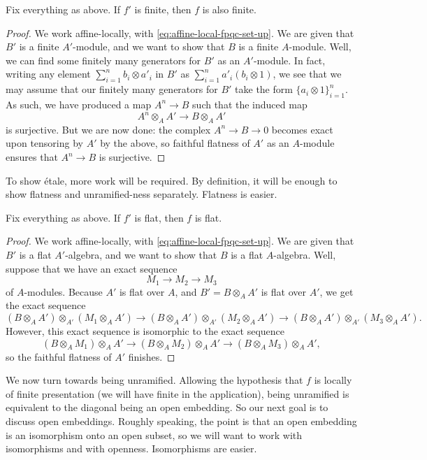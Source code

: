\documentclass{amsart}
\begin{document}
\begin{lemma} \label{lem:finite-descent}
    Fix everything as above. If $f'$ is finite, then $f$ is also finite.
\end{lemma}
\begin{proof}
    We work affine-locally, with \eqref{eq:affine-local-fpqc-set-up}. We are given that $B'$ is a finite $A'$-module, and we want to show that $B$ is a finite $A$-module. Well, we can find some finitely many generators for $B'$ as an $A'$-module. In fact, writing any element $\sum_{i=1}^nb_i\otimes a'_i$ in $B'$ as $\sum_{i=1}^na'_i(b_i\otimes1)$, we see that we may assume that our finitely many generators for $B'$ take the form $\{a_i\otimes1\}_{i=1}^n$. As such, we have produced a map $A^n\to B$ such that the induced map
    \[A^n\otimes_AA'\to B\otimes_AA'\]
    is surjective. But we are now done: the complex $A^n\to B\to0$ becomes exact upon tensoring by $A'$ by the above, so faithful flatness of $A'$ as an $A$-module ensures that $A^n\to B$ is surjective.
\end{proof}
To show \'etale, more work will be required. By definition, it will be enough to show flatness and unramified-ness separately. Flatness is easier.
\begin{lemma} \label{lem:flat-descent}
    Fix everything as above. If $f'$ is flat, then $f$ is flat.
\end{lemma}
\begin{proof}
    We work affine-locally, with \eqref{eq:affine-local-fpqc-set-up}. We are given that $B'$ is a flat $A'$-algebra, and we want to show that $B$ is a flat $A$-algebra. Well, suppose that we have an exact sequence
    \[M_1\to M_2\to M_3\]
    of $A$-modules. Because $A'$ is flat over $A$, and $B'=B\otimes_AA'$ is flat over $A'$, we get the exact sequence
    \[(B\otimes_AA')\otimes_{A'}(M_1\otimes_AA')\to(B\otimes_AA')\otimes_{A'}(M_2\otimes_AA')\to(B\otimes_AA')\otimes_{A'}(M_3\otimes_AA').\]
    However, this exact sequence is isomorphic to the exact sequence
    \[(B\otimes_AM_1)\otimes_AA'\to(B\otimes_AM_2)\otimes_AA'\to(B\otimes_AM_3)\otimes_AA',\]
    so the faithful flatness of $A'$ finishes.
\end{proof}
We now turn towards being unramified. Allowing the hypothesis that $f$ is locally of finite presentation (we will have finite in the application), being unramified is equivalent to the diagonal being an open embedding. So our next goal is to discuss open embeddings. Roughly speaking, the point is that an open embedding is an isomorphism onto an open subset, so we will want to work with isomorphisms and with openness. Isomorphisms are easier.
\end{document}
